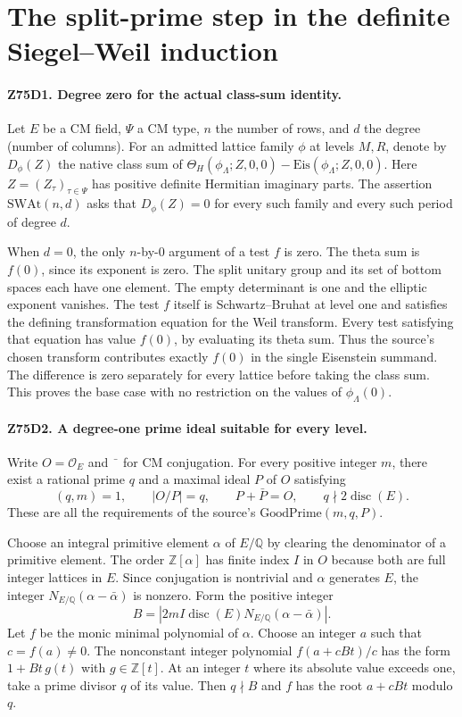 \section{The split-prime step in the definite Siegel--Weil induction}

\paragraph{Z75D1. Degree zero for the actual class-sum identity.}
Let $E$ be a CM field, $\Psi$ a CM type, $n$ the number of rows,
and $d$ the degree (number of columns). For an admitted lattice
family $\phi$ at levels $M,R$, denote by $D_\phi(Z)$ the native
class sum of $\Theta_H(\phi_\Lambda;Z,0,0)-
\mathrm{Eis}(\phi_\Lambda;Z,0,0)$. Here $Z=(Z_\tau)_{\tau\in\Psi}$
has positive definite Hermitian imaginary parts. The assertion
$\mathrm{SWAt}(n,d)$ asks that $D_\phi(Z)=0$ for every such family
and every such period of degree $d$.

When $d=0$, the only $n$-by-$0$ argument of a test $f$ is zero.
The theta sum is $f(0)$, since its exponent is zero. The split
unitary group and its set of bottom spaces each have one element.
The empty determinant is one and the elliptic exponent vanishes.
The test $f$ itself is Schwartz--Bruhat at level one and satisfies
the defining transformation equation for the Weil transform. Every
test satisfying that equation has value $f(0)$, by evaluating its
theta sum. Thus the source's chosen transform contributes exactly
$f(0)$ in the single Eisenstein summand. The difference is zero
separately for every lattice before taking the class sum. This proves
the base case with no restriction on the values of $\phi_\Lambda(0)$.

\paragraph{Z75D2. A degree-one prime ideal suitable for every level.}
Write $O=\mathcal O_E$ and $\bar{\phantom{a}}$ for CM conjugation.
For every positive integer $m$, there exist a rational prime $q$
and a maximal ideal $P$ of $O$ satisfying
\[
 (q,m)=1,\qquad |O/P|=q,\qquad P+\bar P=O,\qquad
 q\nmid 2\operatorname{disc}(E).
\]
These are all the requirements of the source's $\mathrm{GoodPrime}(m,q,P)$.

Choose an integral primitive element $\alpha$ of $E/\mathbb Q$ by
clearing the denominator of a primitive element. The order
$\mathbb Z[\alpha]$ has finite index $I$ in $O$ because both are
full integer lattices in $E$. Since conjugation is nontrivial and
$\alpha$ generates $E$, the integer $N_{E/\mathbb Q}(\alpha-\bar\alpha)$
is nonzero. Form the positive integer
\[
 B=\left|2mI\operatorname{disc}(E)
              N_{E/\mathbb Q}(\alpha-\bar\alpha)\right|.
\]
Let $f$ be the monic minimal polynomial of $\alpha$. Choose an integer
$a$ such that $c=f(a)\ne0$. The nonconstant integer polynomial
$f(a+cBt)/c$ has the form $1+Bt\,g(t)$ with $g\in\mathbb Z[t]$.
At an integer $t$ where its absolute value exceeds one, take a prime
divisor $q$ of its value. Then $q\nmid B$ and $f$ has the root
$a+cBt$ modulo $q$.

